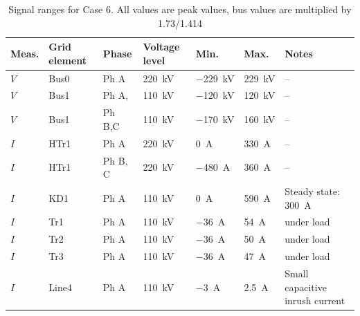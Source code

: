 
\begin{table}[htbp]
  \centering
  \caption{Signal ranges for Case 6. All values are peak values, bus values are multiplied by 1.73/1.414}
  \label{tab:measurement-values-case6}
  \small
  \setlength{\tabcolsep}{3.5pt}
  \renewcommand{\arraystretch}{1.18}
  \begin{tabularx}{\textwidth}{@{}
      >{\raggedright\arraybackslash}p{}
      >{\raggedright\arraybackslash}p{}
      >{\raggedright\arraybackslash}p{}
      >{\raggedright\arraybackslash}p{}
      >{\raggedright\arraybackslash}p{}
      >{\raggedright\arraybackslash}p{}
      Y@{}}
    \toprule
    \textbf{Meas.} &
    \textbf{Grid element} &
    \textbf{Phase} &
    \textbf{Voltage level} &
    \textbf{Min.} &
    \textbf{Max.} &
    \textbf{Notes} \\
    \midrule
    $V$ & Bus0  & Ph A       & \SI{220}{\kilo\volt} & \SI{-229}{\kilo\volt} & \SI{229}{\kilo\volt} & -- \\
    $V$ & Bus1  & Ph A,    & \SI{110}{\kilo\volt} & \SI{-120}{\kilo\volt} & \SI{120}{\kilo\volt} & -- \\
    $V$ & Bus1  & Ph B,C     & \SI{110}{\kilo\volt} & \SI{-170}{\kilo\volt} & \SI{160}{\kilo\volt} & -- \\
    $I$ & HTr1  & Ph A       & \SI{220}{\kilo\volt} & \SI{0}{\ampere} & \SI{330}{\ampere} & -- \\
    $I$ & HTr1  & Ph B, C    & \SI{220}{\kilo\volt} & \SI{-480}{\ampere} & \SI{360}{\ampere} & -- \\
    $I$ & KD1   & Ph A       & \SI{110}{\kilo\volt} & \SI{0}{\ampere} & \SI{590}{\ampere} & Steady state: \SI{300}{\ampere} \\
    $I$ & Tr1   & Ph A       & \SI{110}{\kilo\volt} & \SI{-36}{\ampere} & \SI{54}{\ampere} & under load \\
    $I$ & Tr2   & Ph A       & \SI{110}{\kilo\volt} & \SI{-36}{\ampere} & \SI{50}{\ampere} & under load \\
    $I$ & Tr3   & Ph A      & \SI{110}{\kilo\volt} & \SI{-36}{\ampere} & \SI{47}{\ampere} & under load \\
    $I$ & Line4 & Ph A & \SI{110}{\kilo\volt} & \SI{-3}{\ampere} & \SI{2.5}{\ampere} & Small capacitive inrush current  \\

\end{tabularx}
\end{table}
